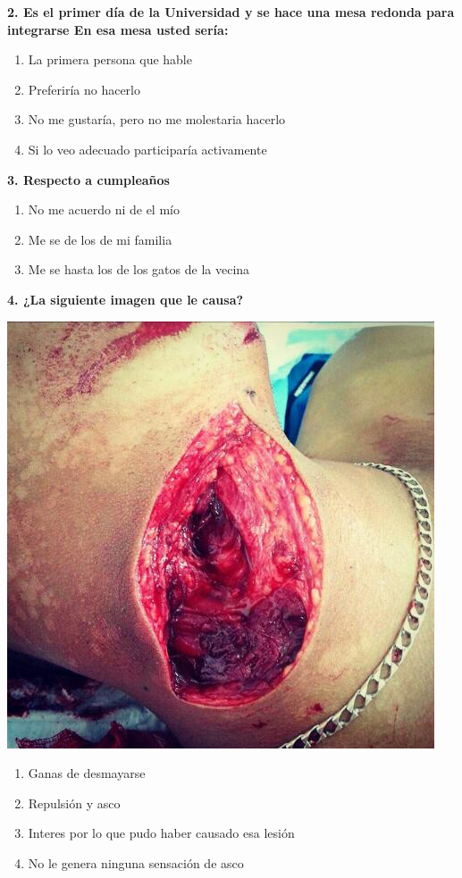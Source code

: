 \documentclass{article}
\begin{document}
\textbf{ 2. Es el primer día de la Universidad y se hace una mesa redonda para integrarse En esa mesa usted sería:}
\begin{enumerate}[label=(\Alph*)] 
\item La primera persona que hable
\item Preferiría no hacerlo
\item No me gustaría, pero no me molestaria hacerlo
\item Si lo veo adecuado participaría activamente
\end{enumerate}




\textbf{3. Respecto a cumpleaños}
\begin{enumerate}[label=(\Alph*)]
\item No me acuerdo ni de el mío
\item Me se de los de mi familia
\item Me se hasta los de los gatos de la vecina
 \end{enumerate}
\pagebreak
\textbf{4. ¿La siguiente imagen que le causa?} \\
\begin{multicols}{2}
 \includegraphics[scale=0.3]{foto.jpg}
 \columnbreak
\begin{enumerate}[label=(\Alph*)] 
\item Ganas de desmayarse
\item Repulsión y asco
\item Interes por lo que pudo haber causado esa lesión
\item No le genera ninguna sensación de asco
\end{enumerate}
\end{multicols}
\end{document}

